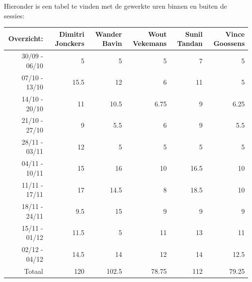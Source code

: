 \documentclass[eind]{penoverslag}
\begin{document}
Hieronder is een tabel te vinden met de gewerkte uren binnen en buiten de sessies: \\

\begin{tabular}{r||r|r|r|r|r}
Overzicht: & Dimitri Jonckers & Wander Bavin & Wout Vekemans & Sunil Tandan & Vince Goossens \\
\hline \hline 
30/09 - 06/10 & 5 & 5 & 5 & 7 & 5 \\
07/10 - 13/10 & 15.5 & 12 & 6 & 11 & 5 \\
14/10 - 20/10 & 11 & 10.5 & 6.75 & 9 & 6.25 \\
21/10 - 27/10 & 9 & 5.5 & 6 & 9 & 5.5 \\
28/11 - 03/11 & 12 & 5 & 5 & 5 & 5 \\
04/11 - 10/11 & 15 & 16 & 10 & 16.5 & 10 \\
11/11 - 17/11 & 17 & 14.5 & 8 & 18.5 & 10 \\
18/11 - 24/11 & 9.5 & 15 & 9 & 9 & 9 \\
15/11 - 01/12 & 11.5 & 5 & 11 & 13 & 11 \\
02/12 - 04/12 & 14.5 & 14 & 12 & 14 & 12.5 \\
\hline \hline
Totaal & 120 & 102.5 & 78.75 & 112 & 79.25 \\
\end{tabular}
\end{document}
